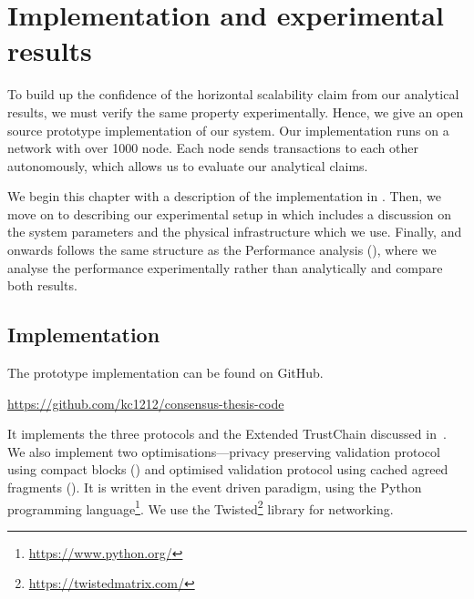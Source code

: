 \chapter{Implementation and experimental results}
\label{ch:implementation}

To build up the confidence of the horizontal scalability claim from our analytical results,
we must verify the same property experimentally.
Hence, we give an open source prototype implementation of our system.
Our implementation runs on a network with over 1000 node.
Each node sends transactions to each other autonomously, 
which allows us to evaluate our analytical claims.

We begin this chapter with a description of the implementation in .
Then, we move on to describing our experimental setup in  which includes a discussion on the system parameters and the physical infrastructure which we use.
Finally,  and onwards follows the same structure as the Performance analysis (),
where we analyse the performance experimentally rather than analytically and compare both results.


\section{Implementation}
\label{sec:implementation}

The prototype implementation can be found on GitHub.
\begin{displayquote}
\url{https://github.com/kc1212/consensus-thesis-code}
\end{displayquote}
It implements the three protocols and the Extended TrustChain discussed in~.
We also implement two optimisations---privacy preserving validation protocol using compact blocks ()
and optimised validation protocol using cached agreed fragments ().
It is written in the event driven paradigm, using the Python programming language\footnote{\url{https://www.python.org/}}.
We use the Twisted\footnote{\url{https://twistedmatrix.com/}} library for networking.

